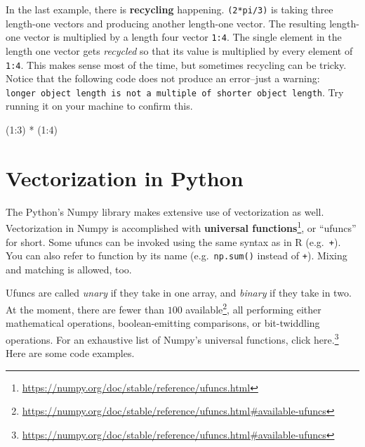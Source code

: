 \documentclass[
  12pt,
  krantz2]{krantz}
\makeatletter
\newenvironment{Shaded}{\begin{snugshade}}{\end{snugshade}}
\newcommand{\DecValTok}[1]{\textcolor[rgb]{0.06,0.06,0.06}{#1}}
\newcommand{\NormalTok}[1]{#1}
\newcommand{\SpecialCharTok}[1]{\textcolor[rgb]{0,0,0}{#1}}
\renewcommand{\href}[2]{#2\footnote{\url{#1}}}
\newenvironment{kframe}{%
\medskip{}
\setlength{\fboxsep}{.8em}
 \def\at@end@of@kframe{}%
 \ifinner\ifhmode%
  \def\at@end@of@kframe{\end{minipage}}%
  \begin{minipage}{\columnwidth}%
 \fi\fi%
 \def\FrameCommand##1{\hskip\@totalleftmargin \hskip-\fboxsep
 \colorbox{shadecolor}{##1}\hskip-\fboxsep
     \hskip-\linewidth \hskip-\@totalleftmargin \hskip\columnwidth}%
 \MakeFramed {\advance\hsize-\width
   \@totalleftmargin\z@ \linewidth\hsize
   \@setminipage}}%
 {\par\unskip\endMakeFramed%
 \at@end@of@kframe}
\renewenvironment{Shaded}{\begin{kframe}}{\end{kframe}}
\makeatother
\begin{document}
In the last example, there is \textbf{recycling} happening. \texttt{(2*pi/3)} is taking three length-one vectors and producing another length-one vector. The resulting length-one vector is multiplied by a length four vector \texttt{1:4}. The single element in the length one vector gets \emph{recycled} so that its value is multiplied by every element of \texttt{1:4}.
This makes sense most of the time, but sometimes recycling can be tricky. Notice that the following code does not produce an error--just a warning: \texttt{longer\ object\ length\ is\ not\ a\ multiple\ of\ shorter\ object\ length}. Try running it on your machine to confirm this.

\begin{Shaded}
\begin{Highlighting}[]
\NormalTok{(}\DecValTok{1}\SpecialCharTok{:}\DecValTok{3}\NormalTok{) }\SpecialCharTok{*}\NormalTok{ (}\DecValTok{1}\SpecialCharTok{:}\DecValTok{4}\NormalTok{)}
\end{Highlighting}
\end{Shaded}

\hypertarget{vectorization-in-python}{%
\section{Vectorization in Python}\label{vectorization-in-python}}

The Python's Numpy library makes extensive use of vectorization as well. Vectorization in Numpy is accomplished with \href{https://numpy.org/doc/stable/reference/ufuncs.html}{\textbf{universal functions}}, or ``ufuncs'' for short. Some ufuncs can be invoked using the same syntax as in R (e.g.~\texttt{+}). You can also refer to function by its name (e.g.~\texttt{np.sum()} instead of \texttt{+}). Mixing and matching is allowed, too.

Ufuncs are called \emph{unary} if they take in one array, and \emph{binary} if they take in two. At the moment, there are \href{https://numpy.org/doc/stable/reference/ufuncs.html\#available-ufuncs}{fewer than \(100\) available}, all performing either mathematical operations, boolean-emitting comparisons, or bit-twiddling operations. For an exhaustive list of Numpy's universal functions, \href{https://numpy.org/doc/stable/reference/ufuncs.html\#available-ufuncs}{click here.} Here are some code examples.
\end{document}
